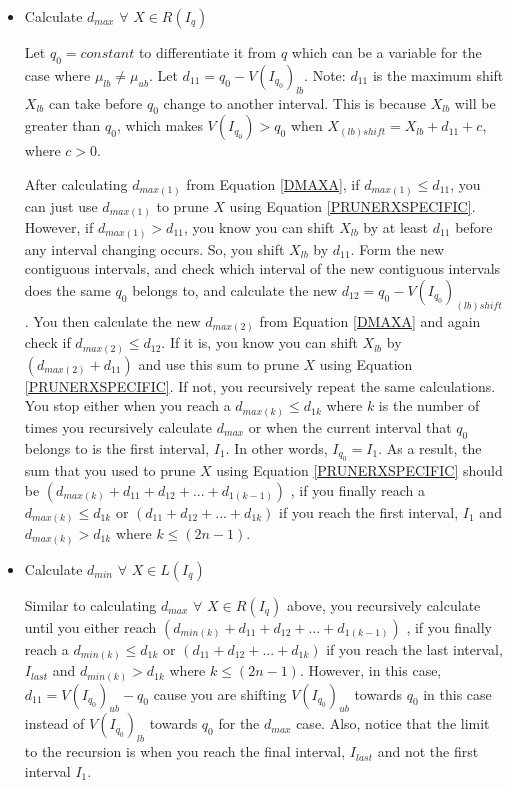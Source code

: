 \documentclass[a4paper,12pt]{article}
\begin{document}
\begin{itemize}
\item Calculate $d_{max}$ $\forall$ $X \in R(I_{q})$

Let $q_{0}=constant$ to differentiate it from $q$ which can be a variable for the case where $\mu_{lb}\neq\mu_{ub}$. Let $d_{11} = q_{0} - V(I_{q_{0}})_{lb}$. Note: 
$d_{11}$ is the maximum shift $X_{lb}$ can take before $q_{0}$ change to another interval. This is because $X_{lb}$ will be greater than $q_{0}$, which makes $V(I_{q_{0}}) > q_{0}$ when $X_{(lb)shift} = X_{lb} + d_{11} + c$, where $c > 0$. 

After calculating $d_{max(1)}$ from Equation \ref{DMAXA}, if $d_{max(1)} \leq d_{11}$, you can just use $d_{max(1)}$ to prune $X$ using Equation \ref{PRUNERXSPECIFIC}. 
However, if $d_{max(1)} > d_{11}$, you know you can shift $X_{lb}$ by at least $d_{11}$ before any interval changing occurs. So, you shift $X_{lb}$ by $d_{11}$. Form the new contiguous intervals, and check which interval of the new contiguous intervals does the same $q_{0}$ belongs to, and calculate the new $d_{12} = q_{0} - V(I_{q_{0}})_{(lb)shift}$. You then calculate the new $d_{max(2)}$ from Equation \ref{DMAXA} and again check if $d_{max(2)} \leq d_{12}$. If it is, you know you can shift $X_{lb}$ by $(d_{max(2)} + d_{11})$ and use this sum to prune $X$ using Equation \ref{PRUNERXSPECIFIC}. If not, you recursively repeat the same calculations. You stop either when you reach a $d_{max(k)} \leq d_{1k}$ where $k$ is the number of times you recursively calculate  $d_{max}$ or when the current interval that $q_{0}$ belongs to is the first interval, $I_{1}$. In other words,  $I_{q_{0}} = I_{1}$.
As a result, the sum that you used to prune $X$ using Equation \ref{PRUNERXSPECIFIC} should be $(d_{max(k)} + d_{11} + d_{12} + ... + d_{1(k-1)})$ , if you finally reach a $d_{max(k)} \leq d_{1k}$ or $(d_{11} + d_{12} + ... + d_{1k})$ if you reach the first interval, $I_{1}$ and $d_{max(k)} > d_{1k}$ where $k \leq (2n-1)$.


\item Calculate $d_{min}$ $\forall$ $X \in L(I_{q})$

Similar to calculating $d_{max}$ $\forall$ $X \in R(I_{q})$ above, you recursively calculate until you either reach $(d_{min(k)} + d_{11} + d_{12} + ... + d_{1(k-1)})$ , if you finally reach a $d_{min(k)} \leq d_{1k}$ or $(d_{11} + d_{12} + ... + d_{1k})$ if you reach the last interval, $I_{last}$ and $d_{min(k)} > d_{1k}$ where $k \leq (2n-1)$. However, in this case, $d_{11} = V(I_{q_{0}})_{ub} - q_{0}$ cause you are shifting $V(I_{q_{0}})_{ub}$ towards $q_{0}$ in this case instead of $V(I_{q_{0}})_{lb}$ towards $q_{0}$ for the $d_{max}$ case. Also, notice that the limit to the recursion is when you reach the final interval, $I_{last}$ and not the first interval $I_{1}$. 


\end{itemize}
\end{document}
